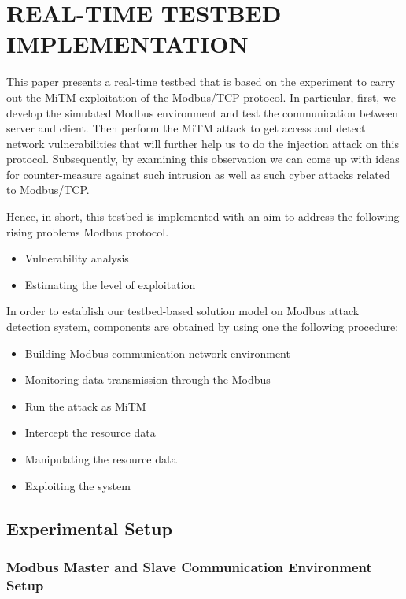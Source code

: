 \documentclass[letterpaper,10pt,conference]{IEEEtran}
\begin{document}
\section{REAL-TIME TESTBED IMPLEMENTATION}

This paper presents a real-time testbed that is based on the experiment to carry out the MiTM exploitation of the Modbus/TCP protocol. In particular, first, we develop the simulated Modbus environment and test the communication between server and client. Then perform the MiTM attack to get access and detect network vulnerabilities that will further help us to do the injection attack on this protocol. Subsequently, by examining this observation we can come up with ideas for counter-measure against such intrusion as well as such cyber attacks related to Modbus/TCP.

Hence, in short, this testbed is implemented with an aim to address the following rising problems Modbus protocol.

\begin{itemize}
\item Vulnerability analysis
\item Estimating the level of exploitation
\end{itemize}

In order to establish our testbed-based solution model on Modbus attack detection system, components are obtained by using one the following procedure:

\begin{itemize}
\item Building Modbus communication network environment
\item Monitoring data transmission through the Modbus
\item Run the attack as MiTM
\item Intercept the resource data
\item Manipulating the resource data
\item Exploiting the system
\end{itemize}



\subsection{Experimental Setup}

\subsubsection{Modbus Master and Slave Communication Environment Setup}
\end{document}
